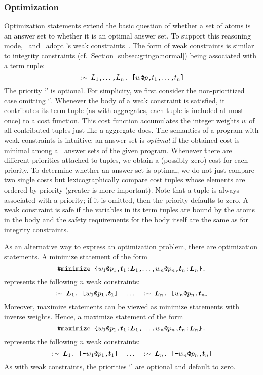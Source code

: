 \subsubsection{Optimization}\label{subsec:gringo:optimize}
Optimization statements extend the basic question of
whether a set of atoms is an answer set to
whether it is an optimal answer set.
To support this reasoning mode, \gringo\ and \clingo\ adopt \dlv's weak constraints~\cite{bflnrp00}.
The form of weak constraints is similar to integrity constraints (cf.~Section \ref{subsec:gringo:normal})
being associated with a term tuple:
%
\[
    \code{:{\raise.17ex\hbox{$\scriptstyle\sim$}}~$L_1$,$\dots$,$L_n$.~[$w$@$p$,$t_1$,$\dots$,$t_n$]}
\]
The priority `' is optional.
For simplicity, we first consider the non-prioritized case omitting `'.
Whenever the body of a weak constraint is satisfied,
it contributes its term tuple (as with aggregates, each tuple is included at most once) to a cost function.
This cost function accumulates the integer weights $w$ of all contributed tuples just like a  aggregate does.
The semantics of a program with weak constraints is intuitive:
an answer set is \emph{optimal}
if the obtained cost is minimal among all answer sets of the given program.
Whenever there are different priorities attached to tuples,
we obtain a (possibly zero) cost for each priority.
To determine whether an answer set is optimal,
we do not just compare two single costs
but lexicographically compare cost tuples whose elements are ordered by priority (greater is more important).
Note that a tuple is always associated with a priority;
if it is omitted, then the priority defaults to zero.
A weak constraint is safe if the variables in its term tuples are bound by the atoms in the body
and the safety requirements for the body itself are the same as for integrity constraints.

As an alternative way to express an optimization problem,
there are optimization statements.
A minimize statement of the form
\[
    \texttt{\#minimize \{$w_1$@$p_1$,$\boldsymbol{t}_1$:$\boldsymbol{L}_1$,$\dots$,$w_n$@$p_n$,$\boldsymbol{t}_n$:$\boldsymbol{L}_n$\}.}
\]
represents the following $n$ weak constraints:
\[
    \code{:{\raise.17ex\hbox{$\scriptstyle\sim$}}~$\boldsymbol{L}_1$.~[$w_1$@$p_1$,$\boldsymbol{t}_1$]}
    \quad \dots \quad
    \code{:{\raise.17ex\hbox{$\scriptstyle\sim$}}~$\boldsymbol{L}_n$.~[$w_n$@$p_n$,$\boldsymbol{t}_n$]}
\]
%
Moreover, maximize statements can be viewed as minimize statements
with inverse weights.
Hence, a maximize statement of the form
\[
    \texttt{\#maximize \{$w_1$@$p_1$,$\boldsymbol{t}_1$:$\boldsymbol{L}_1$,$\dots$,$w_n$@$p_n$,$\boldsymbol{t}_n$:$\boldsymbol{L}_n$\}.}
\]
represents the following $n$ weak constraints:
\[
    \code{:{\raise.17ex\hbox{$\scriptstyle\sim$}}~$\boldsymbol{L}_1$.~[-$w_1$@$p_1$,$\boldsymbol{t}_1$]}
    \quad \dots \quad
    \code{:{\raise.17ex\hbox{$\scriptstyle\sim$}}~$\boldsymbol{L}_n$.~[-$w_n$@$p_n$,$\boldsymbol{t}_n$]}
\]
As with weak constraints, the priorities `' are optional
and default to zero.

